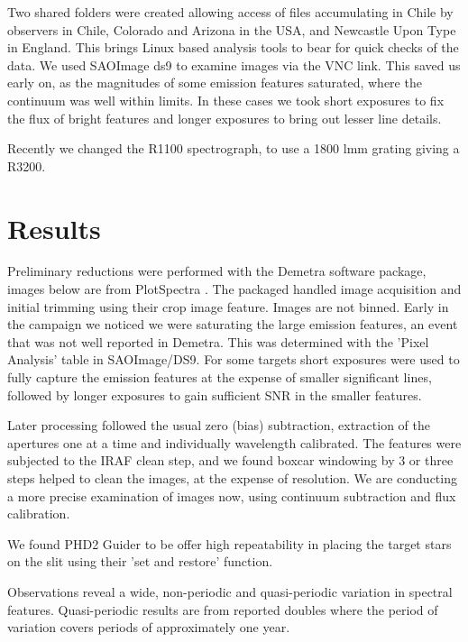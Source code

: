 \documentclass[letter,11pt,oneside]{article}
\begin{document}
Two shared folders were created allowing access of files accumulating
in Chile by observers in Chile, Colorado and Arizona in the USA, and
Newcastle Upon Type in England. This brings Linux based analysis tools
to bear for quick checks of the data. We used SAOImage ds9
\cite{2003ASPC..295..489J} to examine images via the VNC link. This
saved us early on, as the magnitudes of some emission features
saturated, where the continuum was well within limits. In these cases
we took short exposures to fix the flux of bright features and longer
exposures to bring out lesser line details.

Recently we changed the R1100 spectrograph, to use a 1800 lmm grating
giving a R3200. 

\section{Results}

Preliminary reductions were performed with the Demetra \cite{demetra2026} software
package, images below are from PlotSpectra \cite{PlotSpectra}. The packaged handled image
acquisition and initial trimming using their crop image feature. Images
are not binned. Early in the campaign we noticed we were saturating
the large emission features, an event that was not well reported in
Demetra. This was determined with the 'Pixel Analysis' table in
SAOImage/DS9.  For some targets short exposures were used to fully
capture the emission features at the expense of smaller significant
lines, followed by longer exposures to gain sufficient SNR in the
smaller features.

Later processing followed the usual zero (bias) subtraction,
extraction of the apertures one at a time and individually wavelength
calibrated. The features were subjected to the IRAF \cite{2006hstc.conf..437G} clean step, and we
found boxcar windowing by 3 or three steps helped to clean the images,
at the expense of resolution. We are conducting a more precise
examination of images now, using continuum subtraction and
flux calibration.

We found PHD2 Guider \cite{phd2guider} to be offer high repeatability in placing the
target stars on the slit using their 'set and restore'
function.

Observations reveal a wide, non-periodic and quasi-periodic 
variation in spectral features. Quasi-periodic results are
from reported doubles where the period of variation covers
periods of approximately one year.
\end{document}
